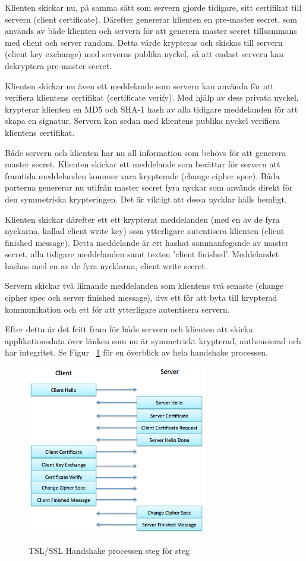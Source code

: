 Klienten skickar nu, på samma sätt som servern gjorde tidigare, sitt certifikat till servern (client certificate). Därefter genererar klienten en pre-master secret, som används av både klienten och servern för att generera master secret tillsammans med client och server random. Detta värde krypteras och skickas till servern (client key exchange) med serverns publika nyckel, så att endast servern kan dekryptera pre-master secret.

Klienten skickar nu även ett meddelande som servern kan använda för att verifiera klientens certifikat (certificate verify). Med hjälp av dess privata nyckel, krypterar klienten en MD5 och SHA-1 hash av alla tidigare meddelanden för att skapa en signatur. Servern kan sedan med klientens publika nyckel verifiera klientens certifikat.

Både servern och klienten har nu all information som behövs för att generera master secret. Klienten skickar ett meddelande som berättar för servern att framtida meddelanden kommer vara krypterade (change cipher spec). Båda parterna genererar nu utifrån master secret fyra nyckar som används direkt för den symmetriska krypteringen. Det är viktigt att dessa nycklar hålls hemligt.

Klienten skickar därefter ett ett krypterat meddelanden (med en av de fyra nyckarna, kallad client write key) som ytterligare autentisera klienten (client finished message). Detta meddelande är ett hashat sammanfogande av master secret, alla tidigare meddelanden samt texten 'client finished'. Meddelandet hashas med en av de fyra nycklarna, client write secret.

Servern skickar två liknande meddelanden som klientens två senaste (change cipher spec och server finished message), dvs ett för att byta till krypterad kommunikation och ett för att ytterligare autentisera servern.

Efter detta är det fritt fram för både servern och klienten att skicka applikationsdata över länken som nu är symmetriskt krypterad, authensierad och har integritet. Se Figur ~\ref{fig:handshake} för en överblick av hela handshake processen.

\begin{figure}[tbp]
        \caption{TSL/SSL Handshake processen steg för steg}
        \centering
                \includegraphics[width=0.7\textwidth]{ssl_handshake.png}
        \label{fig:handshake}
\end{figure}